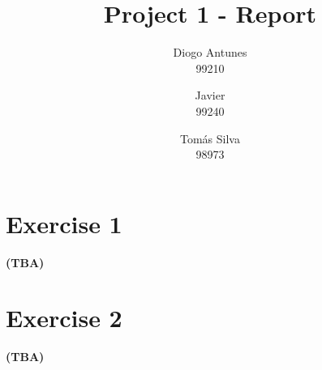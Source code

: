\documentclass[12pt]{article}
\newcommand{\tba}{\textbf{(TBA) }}
\begin{document}
\title{Project 1 - Report}
\author{
  Diogo Antunes\\
  99210
  \and
  Javier\\
  99240
  \and
  Tomás Silva\\
  98973
}

\maketitle

\section*{Exercise 1}

\tba

\section*{Exercise 2}

\tba
\end{document}
